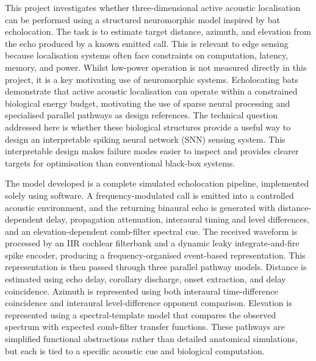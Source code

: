 \clearpage


\vspace{0.5em}

This project investigates whether three-dimensional active acoustic localisation can be performed using a structured neuromorphic model inspired by bat echolocation. The task is to estimate target distance, azimuth, and elevation from the echo produced by a known emitted call. This is relevant to edge sensing because localisation systems often face constraints on computation, latency, memory, and power. Whilst low-power operation is not measured directly in this project, it is a key motivating use of neuromorphic systems. Echolocating bats demonstrate that active acoustic localisation can operate within a constrained biological energy budget, motivating the use of sparse neural processing and specialised parallel pathways as design references. The technical question addressed here is whether these biological structures provide a useful way to design an interpretable spiking neural network (SNN) sensing system. This interpretable design makes failure modes easier to inspect and provides clearer targets for optimisation than conventional black-box systems.

The model developed is a complete simulated echolocation pipeline, implemented solely using software. A frequency-modulated call is emitted into a controlled acoustic environment, and the returning binaural echo is generated with distance-dependent delay, propagation attenuation, interaural timing and level differences, and an elevation-dependent comb-filter spectral cue. The received waveform is processed by an IIR cochlear filterbank and a dynamic leaky integrate-and-fire spike encoder, producing a frequency-organised event-based representation. This representation is then passed through three parallel pathway models. Distance is estimated using echo delay, corollary discharge, onset extraction, and delay coincidence. Azimuth is represented using both interaural time-difference coincidence and interaural level-difference opponent comparison. Elevation is represented using a spectral-template model that compares the observed spectrum with expected comb-filter transfer functions. These pathways are simplified functional abstractions rather than detailed anatomical simulations, but each is tied to a specific acoustic cue and biological computation.

